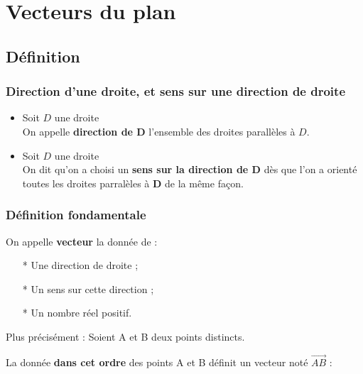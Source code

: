 \ifdefined\COMPLETE
\else
    
    
\fi


\vspace*{-1.5cm}
\section{Vecteurs du plan}

\subsection{Définition}

\subsubsection{Direction d'une droite, et sens sur une direction de droite}

\begin{itemize}
\item Soit $D$ une droite \\ On appelle \textbf{direction de D} l'ensemble des droites parallèles à $D$.

\item Soit $D$ une droite \\ On dit qu'on a choisi un \textbf{sens sur la direction de $\mathbf{D}$} dès que l'on a orienté toutes les droites  parralèles à $\mathbf{D}$ de la même façon.
\end{itemize}

\subsubsection{Définition fondamentale}

On appelle \textbf{vecteur} la donnée de : \\

\begin{itemize}
\item[*] Une direction de droite ;
\item[*] Un sens sur cette direction ;
\item[*] Un nombre réel positif. \\


\end{itemize}

Plus précisément : Soient A et B deux points distincts.

La donnée \textbf{dans cet ordre} des points A et B définit un vecteur noté $\overrightarrow{AB}$ : \\

